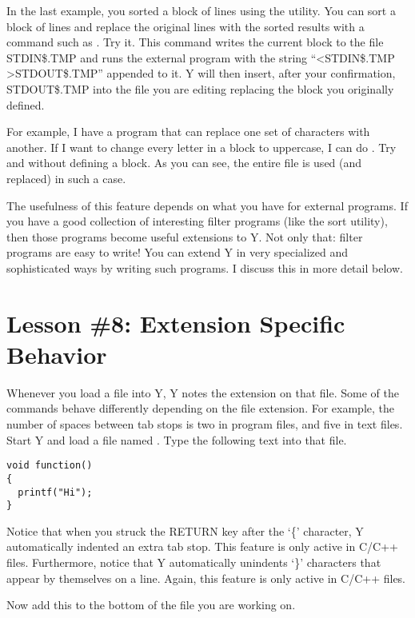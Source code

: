 In the last example, you sorted a block of lines using the utility. You can sort a block of
lines and replace the original lines with the sorted results with a command such as
. Try it. This command writes the current block to the file STDIN\$.TMP and
runs the external program with the string ``<STDIN\$.TMP >STDOUT\$.TMP'' appended to it. Y will
then insert, after your confirmation, STDOUT\$.TMP into the file you are editing replacing the
block you originally defined.

For example, I have a program that can replace one set of characters with another. If I want to
change every letter in a block to uppercase, I can do . Try
 and  without defining a block. As you can see, the
entire file is used (and replaced) in such a case.

The usefulness of this feature depends on what you have for external programs. If you have a
good collection of interesting filter programs (like the sort utility), then those programs
become useful extensions to Y. Not only that: filter programs are easy to write! You can extend
Y in very specialized and sophisticated ways by writing such programs. I discuss this in more
detail below.

\section{Lesson \#8: Extension Specific Behavior}

Whenever you load a file into Y, Y notes the extension on that file. Some of the commands behave
differently depending on the file extension. For example, the number of spaces between tab stops
is two in program files, and five in text files. Start Y and load a file named
. Type the following text into that file.

\begin{verbatim}
void function()
{
  printf("Hi");
}
\end{verbatim}

Notice that when you struck the RETURN key after the `\{' character, Y automatically indented an
extra tab stop. This feature is only active in C/C++ files. Furthermore, notice that Y
automatically unindents `\}' characters that appear by themselves on a line. Again, this feature
is only active in C/C++ files.

Now add this to the bottom of the file you are working on.

